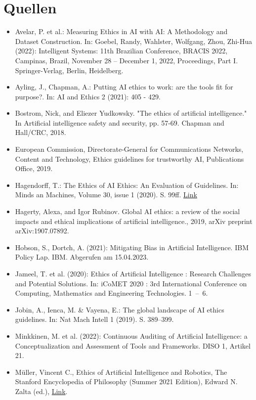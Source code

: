 \documentclass[12pt]{article}
\begin{document}
\section{Quellen}

\begin{itemize}
\item Avelar, P. et al.: Measuring Ethics in AI with AI: A Methodology and Dataset Construction. In: Goebel, Randy, Wahlster, Wolfgang, Zhou, Zhi-Hua (2022): Intelligent Systems: 11th Brazilian Conference, BRACIS 2022, Campinas, Brazil, November 28 – December 1, 2022, Proceedings, Part I. Springer-Verlag, Berlin, Heidelberg.
\item Ayling, J., Chapman, A.: Putting AI ethics to work: are the tools fit for purpose?. In: AI and Ethics 2 (2021): 405 - 429.
\item Bostrom, Nick, and Eliezer Yudkowsky. "The ethics of artificial intelligence." In Artificial intelligence safety and security, pp. 57-69. Chapman and Hall/CRC, 2018.
\item European Commission, Directorate-General for Communications Networks, Content and Technology, Ethics guidelines for trustworthy AI, Publications Office, 2019.
\item Hagendorff, T.: The Ethics of AI Ethics: An Evaluation of Guidelines. In: Minds an Machines, Volume 30, issue 1 (2020). S. 99ff. \href{https://link.springer.com/content/pdf/10.1007/s11023-020-09517-8.pdf}{Link}
\item Hagerty, Alexa, and Igor Rubinov. Global AI ethics: a review of the social impacts and ethical implications of artificial intelligence.,  2019, arXiv preprint arXiv:1907.07892.
\item Hobson, S., Dortch, A. (2021): Mitigating Bias in Artificial Intelligence. IBM Policy Lap. IBM. Abgerufen am 15.04.2023.
\item Jameel, T. et al. (2020): Ethics of Artificial Intelligence : Research Challenges and Potential Solutions. In: iCoMET 2020 : 3rd International Conference on Computing, Mathematics and Engineering Technologies. 1 – 6.
\item Jobin, A., Ienca, M. \& Vayena, E.: The global landscape of AI ethics guidelines. In: Nat Mach Intell 1 (2019). S. 389–399.
\item Minkkinen, M. et al. (2022): Continuous Auditing of Artificial Intelligence: a Conceptualization and Assessment of Tools and Frameworks. DISO 1, Artikel 21.
\item Müller, Vincent C., Ethics of Artificial Intelligence and Robotics, The Stanford Encyclopedia of Philosophy (Summer 2021 Edition), Edward N. Zalta (ed.), \href{https://plato.stanford.edu/archives/sum2021/entries/ethics-ai/}{Link}.

\end{itemize}
\end{document}
